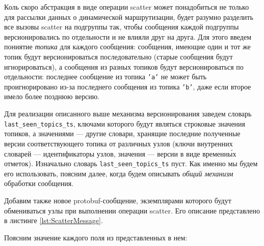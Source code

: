 Коль скоро абстракция в виде операции scatter может понадобиться не только для рассылки данных о динамической маршрутизации, будет разумно разделить все вызовы scatter на подгруппы так, чтобы сообщения каждой подгруппы версионировались по отдельности и не влияли друг на друга. Для этого введем пониятие \textit{топика} для каждого сообщения: сообщения, имеющие один и тот же топик будут версионироваться последовательно (старые сообщения будут игнорироваться), а сообщения из разных топиков будут версионироваться по отдельности: последнее сообщение из топика \texttt{'a'} не может быть проигнорировано из-за последнего сообщения из топика \texttt{'b'}, даже если второе имело более позднюю версию.

Для реализации описанного выше механизма версионирования заведем словарь \texttt{last\_seen\_to\-pics\_ts}, ключами которого будут являться строковые значения топиков, а значениями --- другие словари, хранящие последние полученные версии соответствующего топика от различных узлов (ключи внутренних словарей --- идентификаторы узлов, значения --- версии в виде временн\'{ы}х отметок). Изначально словарь \texttt{last\_seen\_to\-pics\_ts} пуст. Как именно мы будем его использовать, поясним далее, когда будем описывать \textit{общий механизм} обработки сообщения.

Добавим также новое protobuf-сообщение, экземплярами которого будут обмениваться узлы при выполнении операции scatter. Его описание представлено в листинге \ref{lst:ScatterMessage}.



Поясним значение каждого поля из представленных в нем:

